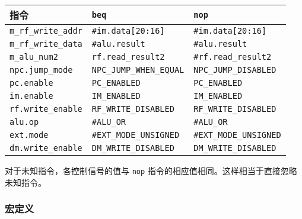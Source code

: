 \begin{longtable}[]{@{}lll@{}}
\toprule
指令 & \texttt{beq} & \texttt{nop}\tabularnewline
\midrule
\endhead
\texttt{m\_rf\_write\_addr} & \texttt{\#im.data{[}20:16{]}} &
\texttt{\#im.data{[}20:16{]}}\tabularnewline
\texttt{m\_rf\_write\_data} & \texttt{\#alu.result} &
\texttt{\#alu.result}\tabularnewline
\texttt{m\_alu\_num2} & \texttt{rf.read\_result2} &
\texttt{\#rf.read\_result2}\tabularnewline
\texttt{npc.jump\_mode} & \texttt{NPC\_JUMP\_WHEN\_EQUAL} &
\texttt{NPC\_JUMP\_DISABLED}\tabularnewline
\texttt{pc.enable} & \texttt{PC\_ENABLED} &
\texttt{PC\_ENABLED}\tabularnewline
\texttt{im.enable} & \texttt{IM\_ENABLED} &
\texttt{IM\_ENABLED}\tabularnewline
\texttt{rf.write\_enable} & \texttt{RF\_WRITE\_DISABLED} &
\texttt{RF\_WRITE\_DISABLED}\tabularnewline
\texttt{alu.op} & \texttt{\#ALU\_OR} & \texttt{\#ALU\_OR}\tabularnewline
\texttt{ext.mode} & \texttt{\#EXT\_MODE\_UNSIGNED} &
\texttt{\#EXT\_MODE\_UNSIGNED}\tabularnewline
\texttt{dm.write\_enable} & \texttt{DM\_WRITE\_DISABLED} &
\texttt{DM\_WRITE\_DISABLED}\tabularnewline
\bottomrule
\end{longtable}

对于未知指令，各控制信号的值与 \texttt{nop}
指令的相应值相同。这样相当于直接忽略未知指令。

\hypertarget{ux5b8fux5b9aux4e49-8}{%
\subsubsection{宏定义}\label{ux5b8fux5b9aux4e49-8}}

